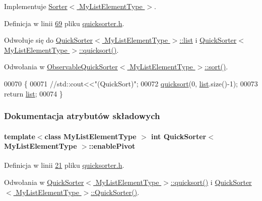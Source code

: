 Implementuje \hyperlink{class_sorter_a4a82d8151d6172802d1e60cb30c7d7d3}{Sorter$<$ My\-List\-Element\-Type $>$}.



Definicja w linii \hyperlink{quicksorter_8h_source_l00069}{69} pliku \hyperlink{quicksorter_8h_source}{quicksorter.\-h}.



Odwołuje się do \hyperlink{quicksorter_8h_source_l00023}{Quick\-Sorter$<$ My\-List\-Element\-Type $>$\-::list} i \hyperlink{quicksorter_8h_source_l00042}{Quick\-Sorter$<$ My\-List\-Element\-Type $>$\-::quicksort()}.



Odwołania w \hyperlink{observablequicksorter_8h_source_l00026}{Observable\-Quick\-Sorter$<$ My\-List\-Element\-Type $>$\-::sort()}.


\begin{DoxyCode}
00070         \{
00071                 \textcolor{comment}{//std::cout<<"(QuickSort)";}
00072                 \hyperlink{class_quick_sorter_aefa16c2996c131443c10183219797632}{quicksort}(0, \hyperlink{class_quick_sorter_a60a7a4772c958f256962294418e83fe4}{list}.size()-1);
00073                 \textcolor{keywordflow}{return} \hyperlink{class_quick_sorter_a60a7a4772c958f256962294418e83fe4}{list};
00074         \}
\end{DoxyCode}


\subsubsection{Dokumentacja atrybutów składowych}
\hypertarget{class_quick_sorter_aba28a6d8a0209191c937fc2bf8c83861}{
\paragraph[{enable\-Pivot}]{\setlength{\rightskip}{0pt plus 5cm}template$<$class My\-List\-Element\-Type $>$ int {\bf Quick\-Sorter}$<$ My\-List\-Element\-Type $>$\-::enable\-Pivot}}\label{class_quick_sorter_aba28a6d8a0209191c937fc2bf8c83861}


Definicja w linii \hyperlink{quicksorter_8h_source_l00021}{21} pliku \hyperlink{quicksorter_8h_source}{quicksorter.\-h}.



Odwołania w \hyperlink{quicksorter_8h_source_l00042}{Quick\-Sorter$<$ My\-List\-Element\-Type $>$\-::quicksort()} i \hyperlink{quicksorter_8h_source_l00028}{Quick\-Sorter$<$ My\-List\-Element\-Type $>$\-::\-Quick\-Sorter()}.

